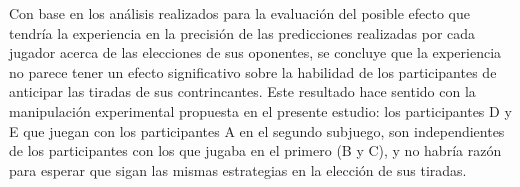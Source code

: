 Con base en los análisis realizados para la evaluación del posible efecto que tendría la experiencia en la precisión de las predicciones realizadas por cada jugador acerca de las elecciones de sus oponentes, se concluye que la experiencia no parece tener un efecto significativo sobre la habilidad de los participantes de anticipar las tiradas de sus contrincantes. Este resultado hace sentido con la manipulación experimental propuesta en el presente estudio: los participantes D y E que juegan con los participantes A en el segundo subjuego, son independientes de los participantes con los que jugaba en el primero (B y C), y no habría razón para esperar que sigan las mismas estrategias en la elección de sus tiradas.
	